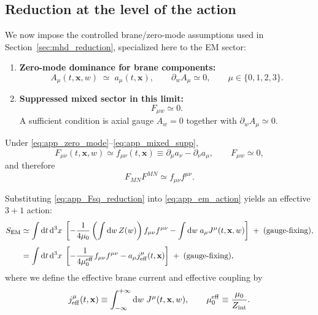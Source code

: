 \documentclass[11pt]{article}
\begin{document}
\subsection{Reduction at the level of the action}
\label{app:action_reduction}

We now impose the controlled brane/zero-mode assumptions used in
Section~\ref{sec:mhd_reduction}, specialized here to the EM sector:

\begin{enumerate}[leftmargin=1.6em]
\item \textbf{Zero-mode dominance for brane components:}
\begin{equation}
A_\mu(t,\mathbf{x},w)\;\simeq\;a_\mu(t,\mathbf{x}),
\qquad
\partial_w A_\mu \simeq 0,
\qquad \mu\in\{0,1,2,3\}.
\label{eq:app_zero_mode}
\end{equation}

\item \textbf{Suppressed mixed sector in this limit:}
\begin{equation}
F_{\mu w}\simeq 0.
\label{eq:app_mixed_supp}
\end{equation}
A sufficient condition is axial gauge \(A_w=0\) together with \(\partial_w A_\mu\simeq 0\).
\end{enumerate}

Under \eqref{eq:app_zero_mode}--\eqref{eq:app_mixed_supp},
\begin{equation}
F_{\mu\nu}(t,\mathbf{x},w)\simeq f_{\mu\nu}(t,\mathbf{x})
\equiv \partial_\mu a_\nu-\partial_\nu a_\mu,
\qquad
F_{\mu w}\simeq 0,
\label{eq:app_F_reduction}
\end{equation}
and therefore
\begin{equation}
F_{MN}F^{MN}
\simeq
f_{\mu\nu}f^{\mu\nu}.
\label{eq:app_Fsq_reduction}
\end{equation}

Substituting \eqref{eq:app_Fsq_reduction} into \eqref{eq:app_em_action} yields an effective
\(3+1\) action:
\begin{align}
S_{\rm EM}
&\simeq
\int \dd t\,\dd^3x\;
\left[
-\frac{1}{4\mu_0}\left(\int \dd w\,Z(w)\right) f_{\mu\nu}f^{\mu\nu}
-\int \dd w\;a_\mu J^\mu(t,\mathbf{x},w)
\right]
\;+\;\text{(gauge-fixing)},
\label{eq:app_action_step1}
\\[4pt]
&=
\int \dd t\,\dd^3x\;
\left[
-\frac{1}{4\mu_0^{\rm eff}} f_{\mu\nu}f^{\mu\nu}
- a_\mu j_{\rm eff}^\mu(t,\mathbf{x})
\right]
\;+\;\text{(gauge-fixing)},
\label{eq:app_action_step2}
\end{align}
where we define the effective brane current and effective coupling by
\begin{equation}
j_{\rm eff}^\mu(t,\mathbf{x})
\equiv
\int_{-\infty}^{+\infty}\dd w\;J^\mu(t,\mathbf{x},w),
\qquad
\mu_0^{\rm eff}\equiv \frac{\mu_0}{Z_{\rm int}}.
\label{eq:app_mu0eff_def}
\end{equation}
\end{document}
